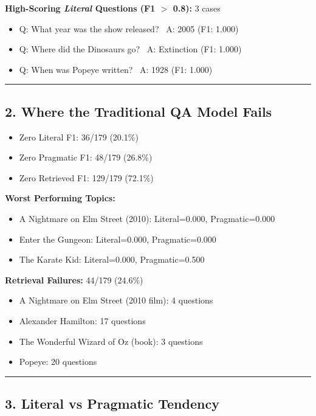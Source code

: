 \documentclass[12pt, letterpaper]{article}
\begin{document}
\noindent \textbf{High-Scoring \emph{Literal} Questions (F1 $>$ 0.8):} 3 cases
\begin{itemize}
    \item Q: What year was the show released? \
 A: 2005 \hfill (F1: 1.000)
    \item Q: Where did the Dinosaurs go? \
 A: Extinction \hfill (F1: 1.000)
    \item Q: When was Popeye written? \
 A: 1928 \hfill (F1: 1.000)
\end{itemize}

\bigskip
\hrule
\subsection*{2. Where the Traditional QA Model Fails}
{}

\begin{itemize}
    \item Zero Literal F1: 36/179 (20.1\%)
    \item Zero Pragmatic F1: 48/179 (26.8\%)
    \item Zero Retrieved F1: 129/179 (72.1\%)
\end{itemize}

\noindent \textbf{Worst Performing Topics:}
\begin{itemize}
    \item A Nightmare on Elm Street (2010): Literal=0.000, Pragmatic=0.000
    \item Enter the Gungeon: Literal=0.000, Pragmatic=0.000
    \item The Karate Kid: Literal=0.000, Pragmatic=0.500
\end{itemize}

\noindent \textbf{Retrieval Failures:} 44/179 (24.6\%)
\begin{itemize}
    \item A Nightmare on Elm Street (2010 film): 4 questions
    \item Alexander Hamilton: 17 questions
    \item The Wonderful Wizard of Oz (book): 3 questions
    \item Popeye: 20 questions
\end{itemize}

\bigskip
\hrule
\subsection*{3. Literal vs Pragmatic Tendency}
{}
\end{document}
